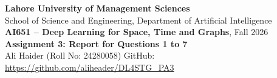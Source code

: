 \documentclass[10pt,a4paper]{article}
\begin{document}
\begin{center}
    {\normalsize\bfseries Lahore University of Management Sciences}\\
    {\small School of Science and Engineering, Department of Artificial Intelligence}\\
    {\small\textbf{AI651 -- Deep Learning for Space, Time and Graphs}, Fall 2026}\\[4pt]
    {\normalsize\bfseries Assignment 3: Report for Questions 1 to 7}\\
    {\small Ali Haider (Roll No: 24280058) \quad GitHub: \url{https://github.com/aliheader/DL4STG_PA3}}
\end{center}
\vspace{-4pt}
















\end{document}
